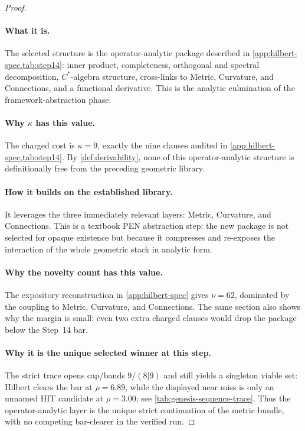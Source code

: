 \documentclass[11pt,a4paper]{article}
\theoremstyle{plain}
\theoremstyle{definition}
\theoremstyle{remark}
\begin{document}
\begin{proof}
\paragraph{What it is.}
The selected structure is the operator-analytic package described in
\cref{app:hilbert-spec,tab:step14}: inner product, completeness, orthogonal and
spectral decomposition, $C^*$-algebra structure, cross-links to Metric,
Curvature, and Connections, and a functional derivative.
This is the analytic culmination of the framework-abstraction phase.

\paragraph{Why $\kappa$ has this value.}
The charged cost is $\kappa=9$, exactly the nine clauses audited in
\cref{app:hilbert-spec,tab:step14}.
By \cref{def:derivability}, none of this operator-analytic structure is
definitionally free from the preceding geometric library.

\paragraph{How it builds on the established library.}
It leverages the three immediately relevant layers: Metric, Curvature, and
Connections.
This is a textbook PEN abstraction step: the new package is not selected for
opaque existence but because it compresses and re-exposes the interaction of the
whole geometric stack in analytic form.

\paragraph{Why the novelty count has this value.}
The expository reconstruction in \cref{app:hilbert-spec} gives
$\nu=62$, dominated by the coupling to Metric, Curvature, and Connections.
The same section also shows why the margin is small: even two extra charged
clauses would drop the package below the Step~14 bar.

\paragraph{Why it is the unique selected winner at this step.}
The strict trace opens cap/bands $9/(8|9)$ and still yields a singleton viable
set: Hilbert clears the bar at $\rho=6.89$, while the displayed near miss is
only an unnamed HIT candidate at $\rho=3.00$; see
\cref{tab:genesis-sequence-trace}.
Thus the operator-analytic layer is the unique strict continuation of the metric
bundle, with no competing bar-clearer in the verified run.
\end{proof}
\end{document}
